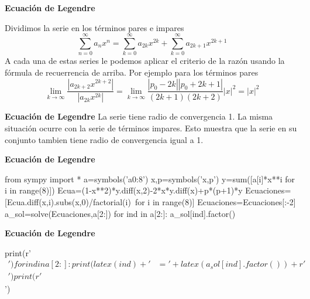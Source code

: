 \begin{frame}[fragile]{\textbf{Ecuación de Legendre}}

 Dividimos la serie en los términos pares e impares
\[\sum\limits_{n=0}^{\infty}a_nx^n= \sum\limits_{k=0}^{\infty}a_{2k}x^{2k}+\sum\limits_{k=0}^{\infty}a_{2k+1}x^{2k+1}\]
A cada una de estas series le podemos aplicar el criterio de la razón usando la fórmula de recuerrencia de arriba. Por ejemplo para los términos pares
\[\lim\limits_{k\to\infty}\frac{|a_{2k+2}x^{2k+2}|}{|a_{2k}x^{2k}|}=\lim\limits_{k\to\infty}\frac{|p_0-2k||p_0+2k+1|}{(2k+1)(2k+2)}|x|^2=|x|^2\]

\end{frame}



\begin{frame}[fragile]{\textbf{Ecuación de Legendre}}
La serie tiene radio de convergencia 1. La misma situación ocurre con la serie de términos impares. Esto muestra que la serie en su conjunto tambien tiene radio de convergencia igual a 1.


\end{frame}


\begin{frame}[fragile]{\textbf{Ecuación de Legendre}}

\begin{sympyblock}[][numbers=left,frame=single,framesep=5mm]
from sympy import *
a=symbols('a0:8')
x,p=symbols('x,p')
y=sum([a[i]*x**i for i in range(8)])
Ecua=(1-x**2)*y.diff(x,2)-2*x*y.diff(x)+p*(p+1)*y
Ecuaciones=[Ecua.diff(x,i).subs(x,0)/factorial(i)\
    for i in range(8)]
Ecuaciones=Ecuaciones[:-2]
a_sol=solve(Ecuaciones,a[2:])
for ind in a[2:]:
    a_sol[ind].factor()
\end{sympyblock}

\end{frame}


\begin{frame}[fragile]{\textbf{Ecuación de Legendre}}

\begin{sympycode}[][numbers=left,frame=single,framesep=5mm]
print(r'\begin{align*}') 
for ind in a[2:]:
    print(latex(ind)+'&='+latex(a_sol[ind].factor())+r'\\') 
print(r'\end{align*}')
\end{sympycode}


\end{frame}

